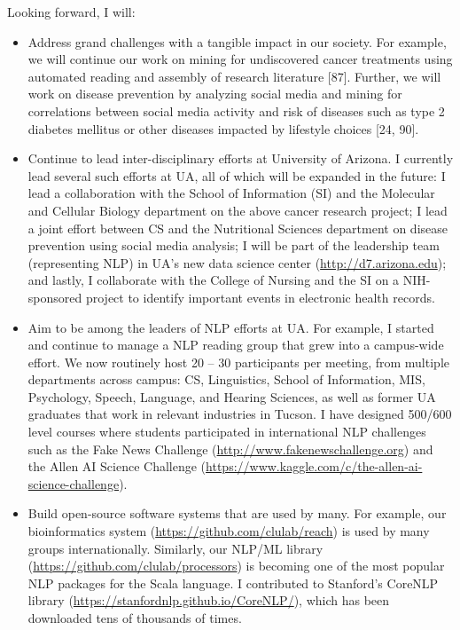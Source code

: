 \documentclass[10pt]{article}
\begin{document}
Looking forward, I will:
\begin{itemize}
\item Address grand challenges with a tangible impact in our society. For example, we will continue our work on mining for undiscovered cancer treatments using automated reading and assembly of research literature [87]. Further, we will work on disease prevention by analyzing social media and mining for correlations between social media activity and risk of diseases such as type 2 diabetes mellitus or other diseases impacted by lifestyle choices [24, 90].
\item Continue to lead inter-disciplinary efforts at University of Arizona. I currently lead several such efforts at UA, all of which will be expanded in the future: I lead a collaboration with the School of Information (SI) and the Molecular and Cellular Biology department on the above cancer research project;
I lead a joint effort between CS and the Nutritional Sciences department on disease prevention using social media analysis; I will be part of the leadership team (representing NLP) in UA's new data science center ({\small \url{http://d7.arizona.edu}}); and lastly, I collaborate with the College of Nursing and the SI on a NIH-sponsored project to identify important events in electronic health records.
\item Aim to be among the leaders of NLP efforts at UA. For example, I started and continue to manage a NLP reading group that grew into a campus-wide effort. We now routinely host 20 -- 30 participants per meeting, from multiple departments across campus: CS, Linguistics, School of Information, MIS, Psychology, Speech, Language, and Hearing Sciences, as well as former UA graduates that work in relevant industries in Tucson. 
I have designed 500/600 level courses where students participated in international NLP challenges such as the Fake News Challenge ({\small \url{http://www.fakenewschallenge.org}}) and the Allen AI Science Challenge ({\small \url{https://www.kaggle.com/c/the-allen-ai-science-challenge}}).
\item Build open-source software systems that are used by many. For example, our bioinformatics system ({\small \url{https://github.com/clulab/reach}}) is used by many groups internationally. Similarly, our NLP/ML library ({\small \url{https://github.com/clulab/processors}}) is becoming one of the most popular NLP packages for the Scala language. I contributed to Stanford's CoreNLP library ({\small \url{https://stanfordnlp.github.io/CoreNLP/}}), which has been downloaded tens of thousands of times. 

\end{itemize}
\end{document}
